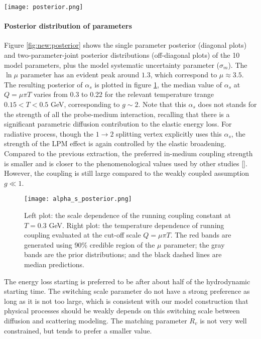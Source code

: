 \begin{figure*}
\centering
\texttt{[image: posterior.png]}
\caption{The single-parameter posterior distributions (diagonal plots) and two-parameter joint posterior distributions (off-diagonal plots).}
\label{fig:new:posterior}
\end{figure*}

\paragraph{Posterior distribution of parameters} Figure \ref{fig:new:posterior} shows the single parameter posterior (diagonal plots) and two-parameter-joint posterior distributions (off-diagonal plots) of the 10 model parameters, plus the model systematic uncertainty parameter ($\sigma_m$).
The $\ln\mu$ parameter has an evident peak around $1.3$, which correspond to $\mu \approx 3.5$.
The resulting posterior of $\alpha_s$ is plotted in figure \ref{fig:new:posterior-alphas}, the median value of $\alpha_s$ at $Q=\mu\pi T$ varies from 0.3 to 0.22 for the relevant temperature trange $0.15 < T < 0.5$ GeV, corresponding to $g\sim 2$.
Note that this $\alpha_s$ does not stands for the strength of all the probe-medium interaction, recalling that there is a significant parametric diffusion contribution to the elastic energy loss.
For radiative process, though the $1\rightarrow 2$ splitting vertex explicitly uses this $\alpha_s$, the strength of the LPM effect is again controlled by the elastic broadening.
Compared to the previous extraction, the preferred in-medium coupling strength is smaller and is closer to the phenomenological values used by other studies [].
However, the coupling is still large compared to the weakly coupled assumption $g\ll 1$.

\begin{figure}
\centering
\texttt{[image: alpha\_s\_posterior.png]}
\caption{Left plot: the scale dependence of the running coupling constant at $T=0.3$ GeV. Right plot: the temperature dependence of running coupling evaluated at the cut-off scale $Q=\mu\pi T$. The red bands are generated using 90\% credible region of the $\mu$ parameter; the gray bands are the prior distributions; and the black dashed lines are median predictions.}
\label{fig:new:posterior-alphas}
\end{figure}

The energy loss starting is preferred to be after about half of the hydrodynamic starting time.
The switching scale parameter do not have a strong preference as long as it is not too large, which is consistent with our model construction that physical processes should be weakly depends on this switching scale between diffusion and scattering modeling.
The matching parameter $R_v$ is not very well constrained, but tends to prefer a smaller value.

